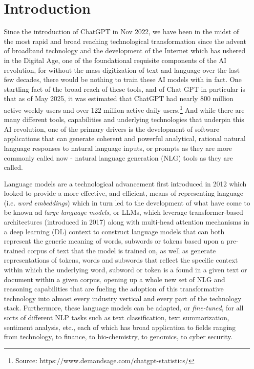 \documentclass[final]{clv2025-revised}
\begin{document}

\section{Introduction}

Since the introduction of ChatGPT in Nov 2022, we have been in the midst of the most rapid and broad reaching technological transformation since the advent of broadband technology and the development of the Internet which has ushered in the Digital Age, one of the foundational requisite components of the AI revolution, for without the mass digitization of text and language over the last few decades, there would be nothing to train these AI models with in fact. One startling fact of the broad reach of these tools, and of Chat GPT in particular is that as of May 2025, it was estimated that ChatGPT had nearly 800 million active weekly users and over 122 million active daily users.\footnote{Source: https://www.demandsage.com/chatgpt-statistics/} And while there are many different tools, capabilities and underlying technologies that underpin this AI revolution, one of the primary drivers is the development of software applications that can generate coherent and powerful analytical, rational natural language responses to natural language inputs, or prompts as they are more commonly called now - natural language generation (NLG) tools as they are called.

Language models are a technological advancement first introduced in 2012 \cite{mikolov} which looked to provide a more effective, and efficient, means of representing language (i.e. \textit{word embeddings}) which in turn led to the development of what have come to be known ad \textit{large language models}\textit, or LLMs, which leverage transformer-based architectures \cite{vaswani} (introduced in 2017) along with multi-head attention mechanisms in a deep learning (DL) context to construct language models that can both represent the generic meaning of words, subwords or tokens based upon a pre-trained corpus of text that the model is trained on, as well as generate representations of tokens, words and subwords that reflect the specific context within which the underlying word, subword or token is a found in a given text or document within a given corpus, opening up a whole new set of NLG and reasoning capabilities that are fueling the adoption of this transformative technology into almost every industry vertical and every part of the technology stack. Furthermore, these language models can be adapted, or \textit{fine-tuned}, for all sorts of different NLP tasks such as text classification, text summarization, sentiment analysis, etc., each of which has broad application to fields ranging from technology, to finance, to bio-chemistry, to genomics, to cyber security.
\end{document}
